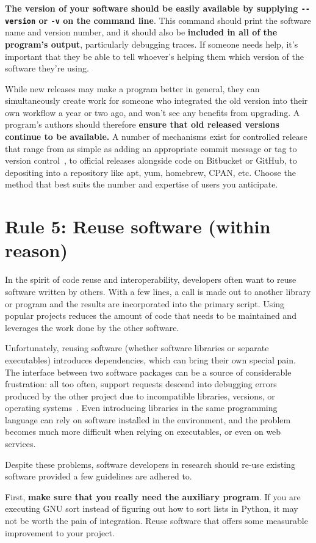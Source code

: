 \documentclass[10pt,letterpaper]{article}
\newcommand{\rulemajor}[1]{\section{#1}}
\newcommand{\ruleminor}[1]{\textbf{#1}}
\begin{document}
\ruleminor{The version of your software should be easily available by
supplying \texttt{-\/-version} or \texttt{-v} on the command
line}. This command should print the software name and version
number, and it should also be \ruleminor{included in all of the
program's output}, particularly debugging traces.  If someone needs
help, it's important that they be able to tell whoever's helping them
which version of the software they're using.

While new releases may make a program better in general, they can
simultaneously create work for someone who integrated the old version
into their own workflow a year or two ago, and won't see any benefits
from upgrading.  A program's authors should therefore
\ruleminor{ensure that old released versions continue to be
available.}  A number of mechanisms exist for controlled release
that range from as simple as adding an appropriate commit message or
tag to version control~\cite{blischak2016}, to official releases
alongside code on Bitbucket or GitHub, to depositing into a repository
like apt, yum, homebrew, CPAN, etc. Choose the method that best suits
the number and expertise of users you anticipate.

\rulemajor{Rule 5: Reuse software (within reason)}

In the spirit of code reuse and interoperability, developers often
want to reuse software written by others.  With a few lines, a call is
made out to another library or program and the results are
incorporated into the primary script. Using popular projects reduces
the amount of code that needs to be maintained and leverages the work
done by the other software.

Unfortunately, reusing software (whether software libraries or
separate executables) introduces dependencies, which can bring their
own special pain. The interface between two software packages can be a
source of considerable frustration: all too often, support requests
descend into debugging errors produced by the other project due to
incompatible libraries, versions, or operating
systems~\cite{brown2013}. Even introducing libraries in the same
programming language can rely on software installed in the
environment, and the problem becomes much more difficult when relying
on executables, or even on web services.

Despite these problems, software developers in research should re-use
existing software provided a few guidelines are adhered to.

First, \ruleminor{make sure that you really need the auxiliary
program}. If you are executing GNU sort instead of figuring out how
to sort lists in Python, it may not be worth the pain of
integration. Reuse software that offers some measurable improvement to
your project.
\end{document}
